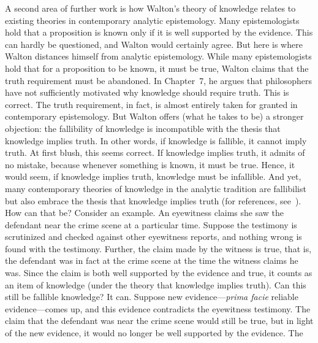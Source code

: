 \documentclass[12pt,a4paper]{article}
\begin{document}
A second area of further work is how Walton's theory of knowledge relates to existing theories 
in contemporary analytic epistemology. 
Many epistemologists hold that a proposition is known 
only if it is well supported by the evidence. This can hardly be questioned, 
and Walton would certainly agree. 
But here is where Walton distances himself 
from analytic epistemology. 
While many epistemologists hold that 
for a proposition to be known, it must be true, Walton claims that the truth requirement 
must be abandoned. In Chapter~7, he argues that philosophers have not sufficiently motivated why knowledge 
should require truth. This is correct. The truth requirement, in fact, is almost 
entirely taken for granted in contemporary epistemology. But Walton offers 
(what he takes to be) a stronger objection: the fallibility of knowledge is incompatible with 
the thesis that knowledge implies truth. 
In other words, if knowledge is fallible, 
it cannot imply truth. At first blush, this seems correct. If knowledge implies truth, it admits of no mistake, because whenever 
something is known, it must be true. 
Hence, it would seem, if knowledge implies truth, knowledge must be infallible. 
And yet, many contemporary theories of knowledge in the analytic tradition are fallibilist 
but also embrace the thesis that knowledge implies truth (for references, see~\citealp{ichikawaSteup2012,steup2005}). 
How can that be? 
Consider an example. 
An eyewitness claims she saw the defendant near the crime scene at a particular time.
Suppose the testimony is scrutinized and checked against other eyewitness reports, and nothing 
wrong is found with the testimony.
Further, the claim made by the witness is true, that is, the defendant was in fact at the crime scene 
at the time the witness claims he was. Since the claim is both well supported by the evidence and true, 
it counts as an item of knowledge (under the theory that knowledge implies truth). 
Can this still be fallible knowledge? It can. 
Suppose new evidence---\textit{prima facie} reliable evidence---comes up, and this evidence 
contradicts the eyewitness testimony. The claim that the defendant was near the crime scene would still 
be true, but in light of the new evidence, it would no longer be well supported by the evidence. The 
\end{document}
